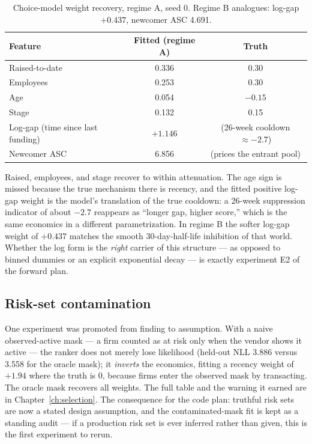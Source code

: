 \begin{table}[htbp]
\centering
\small
\begin{tabular}{lcc}
\toprule
Feature & Fitted (regime A) & Truth \\
\midrule
Raised-to-date & 0.336 & 0.30 \\
Employees & 0.253 & 0.30 \\
Age & 0.054 & $-0.15$ \\
Stage & 0.132 & 0.15 \\
Log-gap (time since last funding) & $+1.146$ & (26-week cooldown $\approx -2.7$) \\
Newcomer ASC & 6.856 & (prices the entrant pool) \\
\bottomrule
\end{tabular}
\caption{Choice-model weight recovery, regime A, seed 0. Regime B analogues: log-gap $+0.437$, newcomer
ASC 4.691.}
\label{tab:cp-weights}
\end{table}

Raised, employees, and stage recover to within attenuation. The age sign is missed because the true
mechanism there is recency, and the fitted positive log-gap weight is the model's translation of the true
cooldown: a 26-week suppression indicator of about $-2.7$ reappears as ``longer gap, higher score,'' which
is the same economics in a different parametrization. In regime B the softer log-gap weight of $+0.437$
matches the smooth 30-day-half-life inhibition of that world. Whether the log form is the \emph{right}
carrier of this structure --- as opposed to binned dummies or an explicit exponential decay --- is exactly
experiment E2 of the forward plan.

\subsection{Risk-set contamination}
\label{sec:cp-riskset}

One experiment was promoted from finding to assumption. With a naive observed-active mask --- a firm counted
as at risk only when the vendor shows it active --- the ranker does not merely lose likelihood (held-out NLL
3.886 versus 3.558 for the oracle mask); it \emph{inverts} the economics, fitting a recency weight of
$+1.94$ where the truth is 0, because firms enter the observed mask by transacting. The oracle mask recovers
all weights. The full table and the warning it earned are in Chapter~\ref{ch:selection}. The consequence for
the code plan: truthful risk sets are now a stated design assumption, and the contaminated-mask fit is kept
as a standing audit --- if a production risk set is ever inferred rather than given, this is the first
experiment to rerun.


